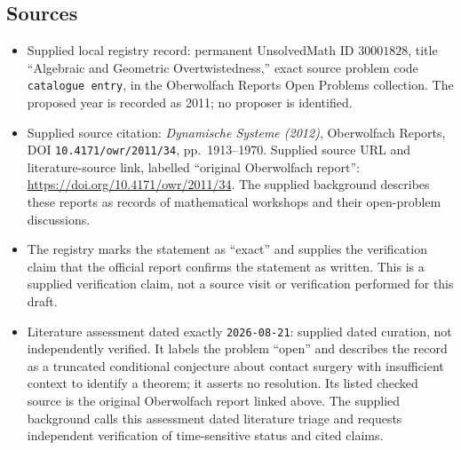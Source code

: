 \documentclass[11pt]{article}
\begin{document}
\subsection{Sources}
\begin{itemize}
\item Supplied local registry record: permanent UnsolvedMath ID \(30001828\), title ``Algebraic and Geometric Overtwistedness,'' exact source problem code \texttt{catalogue entry}, in the Oberwolfach Reports Open Problems collection. The proposed year is recorded as 2011; no proposer is identified.
\item Supplied source citation: \emph{Dynamische Systeme (2012)}, Oberwolfach Reports, DOI \texttt{10.4171/owr/2011/34}, pp.\ 1913--1970. Supplied source URL and literature-source link, labelled ``original Oberwolfach report'': \url{https://doi.org/10.4171/owr/2011/34}. The supplied background describes these reports as records of mathematical workshops and their open-problem discussions.
\item The registry marks the statement as ``exact'' and supplies the verification claim that the official report confirms the statement as written. This is a supplied verification claim, not a source visit or verification performed for this draft.
\item Literature assessment dated exactly \texttt{2026-08-21}: supplied dated curation, not independently verified. It labels the problem ``open'' and describes the record as a truncated conditional conjecture about contact surgery with insufficient context to identify a theorem; it asserts no resolution. Its listed checked source is the original Oberwolfach report linked above. The supplied background calls this assessment dated literature triage and requests independent verification of time-sensitive status and cited claims.
\end{itemize}
\end{document}
